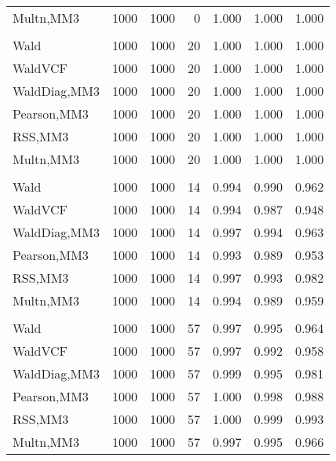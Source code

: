 \documentclass[
]{article}
\begin{document}
\begin{table}[H]
{\begin{tabular}[t]{lrrrrrr}
\hspace{1em}Multn,MM3 & 1000 & 1000 & 0 & 1.000 & 1.000 & 1.000\\
\addlinespace[0.3em]
\multicolumn{7}{l}{\textbf{1F 15V}}\\
\hspace{1em}Wald & 1000 & 1000 & 20 & 1.000 & 1.000 & 1.000\\
\hspace{1em}WaldVCF & 1000 & 1000 & 20 & 1.000 & 1.000 & 1.000\\
\hspace{1em}WaldDiag,MM3 & 1000 & 1000 & 20 & 1.000 & 1.000 & 1.000\\
\hspace{1em}Pearson,MM3 & 1000 & 1000 & 20 & 1.000 & 1.000 & 1.000\\
\hspace{1em}RSS,MM3 & 1000 & 1000 & 20 & 1.000 & 1.000 & 1.000\\
\hspace{1em}Multn,MM3 & 1000 & 1000 & 20 & 1.000 & 1.000 & 1.000\\
\addlinespace[0.3em]
\multicolumn{7}{l}{\textbf{2F 10V}}\\
\hspace{1em}Wald & 1000 & 1000 & 14 & 0.994 & 0.990 & 0.962\\
\hspace{1em}WaldVCF & 1000 & 1000 & 14 & 0.994 & 0.987 & 0.948\\
\hspace{1em}WaldDiag,MM3 & 1000 & 1000 & 14 & 0.997 & 0.994 & 0.963\\
\hspace{1em}Pearson,MM3 & 1000 & 1000 & 14 & 0.993 & 0.989 & 0.953\\
\hspace{1em}RSS,MM3 & 1000 & 1000 & 14 & 0.997 & 0.993 & 0.982\\
\hspace{1em}Multn,MM3 & 1000 & 1000 & 14 & 0.994 & 0.989 & 0.959\\
\addlinespace[0.3em]
\multicolumn{7}{l}{\textbf{3F 15V}}\\
\hspace{1em}Wald & 1000 & 1000 & 57 & 0.997 & 0.995 & 0.964\\
\hspace{1em}WaldVCF & 1000 & 1000 & 57 & 0.997 & 0.992 & 0.958\\
\hspace{1em}WaldDiag,MM3 & 1000 & 1000 & 57 & 0.999 & 0.995 & 0.981\\
\hspace{1em}Pearson,MM3 & 1000 & 1000 & 57 & 1.000 & 0.998 & 0.988\\
\hspace{1em}RSS,MM3 & 1000 & 1000 & 57 & 1.000 & 0.999 & 0.993\\
\hspace{1em}Multn,MM3 & 1000 & 1000 & 57 & 0.997 & 0.995 & 0.966\\
\bottomrule
\end{tabular}}
\endgroup{}
\end{table}
\end{document}
